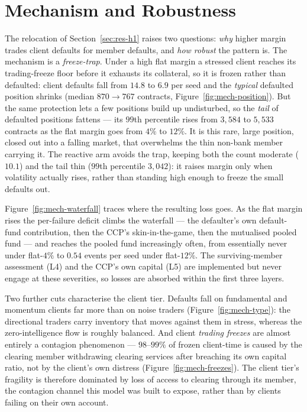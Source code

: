 \section{Mechanism and Robustness}\label{sec:res-mech}

The relocation of Section~\ref{sec:res-h1} raises two questions: \emph{why} higher margin trades client
defaults for member defaults, and \emph{how robust} the pattern is. The mechanism is a
\emph{freeze-trap}. Under a high flat margin a stressed client reaches its trading-freeze floor before
it exhausts its collateral, so it is frozen rather than defaulted: client defaults fall from $14.8$ to
$6.9$ per seed and the \emph{typical} defaulted position shrinks (median $870 \to 767$ contracts,
Figure~\ref{fig:mech-position}). But the same protection lets a few positions build up undisturbed, so
the \emph{tail} of defaulted positions fattens --- its $99$th percentile rises from $3{,}584$ to
$5{,}533$ contracts as the flat margin goes from $4\%$ to $12\%$. It is this rare, large position,
closed out into a falling market, that overwhelms the thin non-bank member carrying it. The reactive
arm avoids the trap, keeping both the count moderate ($10.1$) and the tail thin ($99$th percentile
$3{,}042$): it raises margin only when volatility actually rises, rather than standing high enough to
freeze the small defaults out.

Figure~\ref{fig:mech-waterfall} traces where the resulting loss goes. As the flat margin rises the
per-failure deficit climbs the waterfall --- the defaulter's own default-fund contribution, then the
CCP's skin-in-the-game, then the mutualised pooled fund --- and reaches the pooled fund increasingly
often, from essentially never under flat-$4\%$ to $0.54$ events per seed under flat-$12\%$. The
surviving-member assessment (L4) and the CCP's own capital (L5) are implemented but never engage at
these severities, so losses are absorbed within the first three layers.

Two further cuts characterise the client tier. Defaults fall on fundamental and momentum clients far
more than on noise traders (Figure~\ref{fig:mech-type}): the directional traders carry inventory that
moves against them in stress, whereas the zero-intelligence flow is roughly balanced. And client
\emph{trading freezes} are almost entirely a contagion phenomenon --- $98$--$99\%$ of frozen
client-time is caused by the clearing member withdrawing clearing services after breaching its own
capital ratio, not by the client's own distress (Figure~\ref{fig:mech-freezes}). The client tier's
fragility is therefore dominated by loss of access to clearing through its member, the contagion
channel this model was built to expose, rather than by clients failing on their own account.

